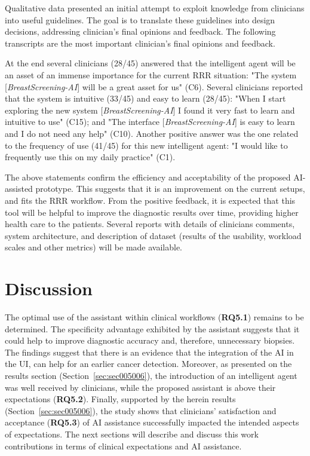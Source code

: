 Qualitative data presented an initial attempt to exploit knowledge from clinicians into useful guidelines.
The goal is to translate these guidelines into design decisions, addressing clinician's final opinions and feedback.
The following transcripts are the most important clinician's final opinions and feedback.

At the end several clinicians (28/45) answered that the intelligent agent will be an asset of an immense importance for the current \ac{RRR} situation:
"The system [{\it BreastScreening-AI}] will be a great asset for us" (C6).
Several clinicians reported that the system is intuitive (33/45) and easy to learn (28/45):
"When I start exploring the new system [{\it BreastScreening-AI}] I found it very fast to learn and intuitive to use" (C15); and
"The interface [{\it BreastScreening-AI}] is easy to learn and I do not need any help" (C10).
Another positive answer was the one related to the frequency of use (41/45) for this new intelligent agent:
"I would like to frequently use this on my daily practice" (C1).

The above statements confirm the efficiency and acceptability of the proposed \ac{AI}-assisted prototype.
This suggests that it is an improvement on the current setups, and fits the \ac{RRR} workflow.
From the positive feedback, it is expected that this tool will be helpful to improve the diagnostic results over time, providing higher health care to the patients.
Several reports with details of clinicians comments, system architecture, and description of dataset (results of the usability, workload scales and other metrics) will be made available.

\section{Discussion}
\label{sec:sec005007}

The optimal use of the assistant within clinical workflows ({\bf RQ5.1}) remains to be determined.
The specificity advantage exhibited by the assistant suggests that it could help to improve diagnostic accuracy and, therefore, unnecessary biopsies.
The findings suggest that there is an evidence that the integration of the \ac{AI} in the \ac{UI}, can help for an earlier cancer detection.
Moreover, as presented on the results section (Section~\ref{sec:sec005006}), the introduction of an intelligent agent was well received by clinicians, while the proposed assistant is above their expectations ({\bf RQ5.2}).
Finally, supported by the herein results (Section~\ref{sec:sec005006}), the study shows that clinicians' satisfaction and acceptance ({\bf RQ5.3}) of \ac{AI} assistance successfully impacted the intended aspects of expectations.
The next sections will describe and discuss this work contributions in terms of clinical expectations and \ac{AI} assistance.

